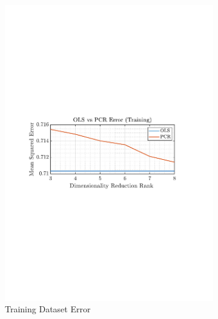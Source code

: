 \documentclass[12pt]{article}
\begin{document}
 	\begin{figure}[H]
 		\centering
 		\begin{subfigure}{0.49\textwidth}
 			\centering
 			\includegraphics[trim={2.2cm 11.2cm 3.15cm  11.2cm}, clip, width=\textwidth]{../MATLAB/figures/q1_6c_fig01.pdf} 
 			\captionsetup{justification=centering}
 			\caption{Training Dataset Error}
 		\end{subfigure}
 		\begin{subfigure}{0.49\textwidth}
 			\centering

\end{subfigure}
\end{figure}
\end{document}
